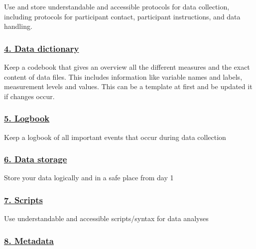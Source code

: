\documentclass[
  letterpaper,
  DIV=11,
  numbers=noendperiod]{scrreprt}
\begin{document}
Use and store understandable and accessible protocols for data
collection, including protocols for participant contact, participant
instructions, and data handling.

\hypertarget{data-dictionary}{%
\subsubsection*{\texorpdfstring{\protect\hyperlink{data-dictionary-1}{4.
Data dictionary}}{4. Data dictionary}}\label{data-dictionary}}

Keep a codebook that gives an overview all the different measures and
the exact content of data files. This includes information like variable
names and labels, measurement levels and values. This can be a template
at first and be updated it if changes occur.

\hypertarget{logbook}{%
\subsubsection*{\texorpdfstring{\protect\hyperlink{logbook-1}{5.
Logbook}}{5. Logbook}}\label{logbook}}

Keep a logbook of all important events that occur during data collection

\hypertarget{data-storage}{%
\subsubsection*{\texorpdfstring{\protect\hyperlink{data-storage-1}{6.
Data storage}}{6. Data storage}}\label{data-storage}}

Store your data logically and in a safe place from day 1

\hypertarget{scripts}{%
\subsubsection*{\texorpdfstring{\protect\hyperlink{scripts-1}{7.
Scripts}}{7. Scripts}}\label{scripts}}

Use understandable and accessible scripts/syntax for data analyses

\hypertarget{metadata}{%
\subsubsection*{\texorpdfstring{\protect\hyperlink{metadata-1}{8.
Metadata}}{8. Metadata}}\label{metadata}}
\end{document}
